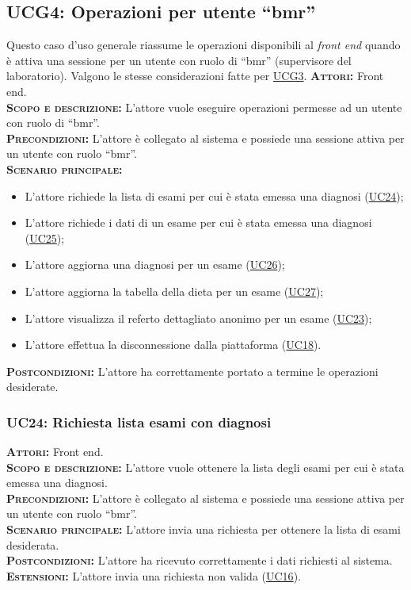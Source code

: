 \subsection{UCG4: Operazioni per utente ``bmr''}
\label{sec:UCG4}
Questo caso d'uso generale riassume le operazioni disponibili al \textit{front end} quando è attiva una sessione per un utente con ruolo di ``bmr'' (supervisore del laboratorio). Valgono le stesse considerazioni fatte per \hyperref[sec:UCG3]{UCG3}.
\textsc{\textbf{Attori:}} Front end.\\
\textsc{\textbf{Scopo e descrizione:}} L'attore vuole eseguire operazioni permesse ad un utente con ruolo di ``bmr''.\\
\textsc{\textbf{Precondizioni:}} L'attore è collegato al sistema e possiede una sessione attiva per un utente con ruolo ``bmr''.\\
\textsc{\textbf{Scenario principale:}} 
\begin{itemize}
    \item L'attore richiede la lista di esami per cui è stata emessa una diagnosi (\hyperref[sec:UC24]{UC24});
    \item L'attore richiede i dati di un esame per cui è stata emessa una diagnosi (\hyperref[sec:UC25]{UC25});
    \item L'attore aggiorna una diagnosi per un esame (\hyperref[sec:UC26]{UC26});
    \item L'attore aggiorna la tabella della dieta per un esame (\hyperref[sec:UC27]{UC27});
    \item L'attore visualizza il referto dettagliato anonimo per un esame (\hyperref[sec:UC23]{UC23});
    \item L'attore effettua la disconnessione dalla piattaforma (\hyperref[sec:UC18]{UC18}).
\end{itemize}
\textsc{\textbf{Postcondizioni:}} L'attore ha correttamente portato a termine le operazioni desiderate.

\subsubsection{UC24: Richiesta lista esami con diagnosi}
\label{sec:UC24}
\textsc{\textbf{Attori:}} Front end.\\
\textsc{\textbf{Scopo e descrizione:}} L'attore vuole ottenere la lista degli esami per cui è stata emessa una diagnosi.\\
\textsc{\textsc{\textbf{Precondizioni:}}} L'attore è collegato al sistema e possiede una sessione attiva per un utente con ruolo ``bmr''.\\
\textsc{\textbf{Scenario principale:}} L'attore invia una richiesta per ottenere la lista di esami desiderata.\\
\textsc{\textbf{Postcondizioni:}} L'attore ha ricevuto correttamente i dati richiesti al sistema.\\
\textsc{\textbf{Estensioni:}} L'attore invia una richiesta non valida (\hyperref[sec:UC16]{UC16}).

